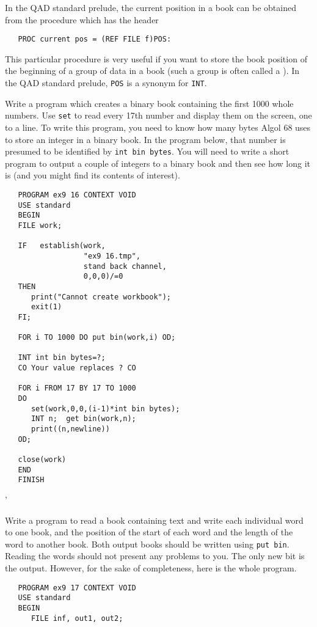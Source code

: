 In the QAD standard prelude, the current position in a book can be
obtained from the procedure  which has the header
\begin{verbatim}
   PROC current pos = (REF FILE f)POS:
\end{verbatim}
\noindent
This particular procedure is very useful if you want to store the
book position of the beginning of a group of data in a book (such a
group is often called a ). In the QAD
standard prelude, \verb|POS| is a synonym for \verb|INT|.

\begin{exercise}
\item Write a program which creates a binary book containing the
first 1000 whole numbers. Use \verb|set| to read every 17th number
and display them on the screen, one to a line. \ans To write this
program, you need to know how many bytes Algol 68 uses to store an
integer in a binary book. In the program below, that number is
presumed to be identified by \verb|int bin bytes|. You will need to
write a short program to output a couple of integers to a binary book
and then see how long it is (and you might find its contents of
interest).
\begin{verbatim}
   PROGRAM ex9 16 CONTEXT VOID
   USE standard
   BEGIN
   FILE work;

   IF   establish(work,
                  "ex9 16.tmp",
                  stand back channel,
                  0,0,0)/=0
   THEN
      print("Cannot create workbook");
      exit(1)
   FI;

   FOR i TO 1000 DO put bin(work,i) OD;

   INT int bin bytes=?;
   CO Your value replaces ? CO

   FOR i FROM 17 BY 17 TO 1000
   DO
      set(work,0,0,(i-1)*int bin bytes);
      INT n;  get bin(work,n);
      print((n,newline))
   OD;

   close(work)
   END
   FINISH
\end{verbatim}
'
\item Write a program to read a book containing text and write each
individual word to one book, and the position of the start of each
word and the length of the word to another book. Both output books
should be written using \verb|put bin|. \ans Reading the words should
not present any problems to you. The only new bit is the output.
However, for the sake of completeness, here is the whole program.
\begin{verbatim}
   PROGRAM ex9 17 CONTEXT VOID
   USE standard
   BEGIN
      FILE inf, out1, out2;


\end{verbatim}
\end{exercise}
